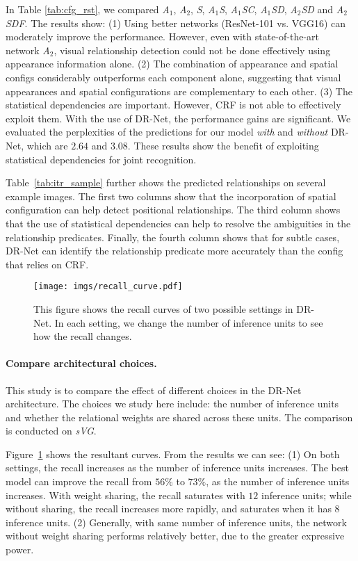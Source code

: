\documentclass[10pt,twocolumn,letterpaper]{article}
\begin{document}
In Table \ref{tab:cfg_rst},
we compared \emph{A$_1$}, \emph{A$_2$}, \emph{S}, \emph{A$_1$S}, \emph{A$_1$SC}, \emph{A$_1$SD}, \emph{A$_2$SD} and \emph{A$_2$SDF}.
The results show:
(1) Using better networks (ResNet-101 vs. VGG16) can moderately improve the performance.
However, even with state-of-the-art network \emph{A$_2$},
visual relationship detection could not be done effectively using appearance information alone.
(2) The combination of appearance and spatial configs considerably outperforms each component alone,
suggesting that visual appearances and spatial configurations are complementary to each other.
(3) The statistical dependencies are important. However, CRF is not able to effectively exploit them.
With the use of DR-Net, the performance gains are significant.
We evaluated the perplexities of the predictions for our model \emph{with} and \emph{without} DR-Net,
which are $2.64$ and $3.08$. These results show the benefit of exploiting statistical dependencies for joint recognition.

Table~\ref{tab:itr_sample} further shows the predicted relationships on several example images.
The first two columns show that the incorporation of spatial configuration can
help detect positional relationships.
The third column shows that the use of statistical dependencies can help
to resolve the ambiguities in the relationship predicates.
Finally, the fourth column shows that for subtle cases,
DR-Net can identify the relationship predicate more accurately than
the config that relies on CRF.

\begin{figure}
    \centering
    \texttt{[image: imgs/recall\_curve.pdf]}
    \caption{\small
	This figure shows the recall curves of two possible settings in DR-Net.
        In each setting, we change the number of inference units to see how the recall changes.}
    \label{fig:drnet_curve}
\end{figure}\paragraph{Compare architectural choices.}

This study is to compare the effect of different choices in the DR-Net architecture.
The choices we study here include:
the number of inference units and whether the relational weights are shared
across these units.
The comparison is conducted on \emph{sVG}.

Figure~\ref{fig:drnet_curve} shows the resultant curves.
From the results we can see:
(1) On both settings, the recall increases as the number of inference units increases.
The best model can improve the recall from $56\%$ to $73\%$, as the number
of inference units increases.
With weight sharing, the recall saturates with $12$ inference units;
while without sharing, the recall increases more rapidly, and saturates when it has $8$ inference units.
(2) Generally, with same number of inference units,
the network without weight sharing performs relatively better,
due to the greater expressive power.
\end{document}
